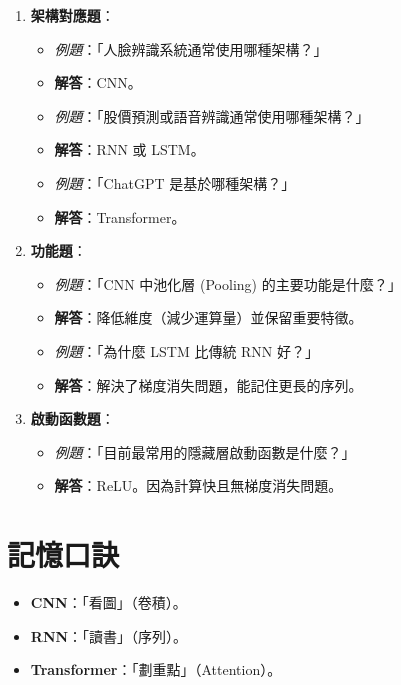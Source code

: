 \documentclass[
  letterpaper,
  DIV=11,
  numbers=noendperiod]{scrreprt}
\providecommand{\tightlist}{%
  \setlength{\itemsep}{0pt}\setlength{\parskip}{0pt}}
\begin{document}
\begin{enumerate}
\def\labelenumi{\arabic{enumi}.}
\tightlist
\item
  \textbf{架構對應題}：

  \begin{itemize}
  \tightlist
  \item
    \emph{例題}：「人臉辨識系統通常使用哪種架構？」
  \item
    \textbf{解答}：CNN。
  \item
    \emph{例題}：「股價預測或語音辨識通常使用哪種架構？」
  \item
    \textbf{解答}：RNN 或 LSTM。
  \item
    \emph{例題}：「ChatGPT 是基於哪種架構？」
  \item
    \textbf{解答}：Transformer。
  \end{itemize}
\item
  \textbf{功能題}：

  \begin{itemize}
  \tightlist
  \item
    \emph{例題}：「CNN 中池化層 (Pooling) 的主要功能是什麼？」
  \item
    \textbf{解答}：降低維度（減少運算量）並保留重要特徵。
  \item
    \emph{例題}：「為什麼 LSTM 比傳統 RNN 好？」
  \item
    \textbf{解答}：解決了梯度消失問題，能記住更長的序列。
  \end{itemize}
\item
  \textbf{啟動函數題}：

  \begin{itemize}
  \tightlist
  \item
    \emph{例題}：「目前最常用的隱藏層啟動函數是什麼？」
  \item
    \textbf{解答}：ReLU。因為計算快且無梯度消失問題。
  \end{itemize}
\end{enumerate}

\section{記憶口訣}\label{ux8a18ux61b6ux53e3ux8a23-6}

\begin{itemize}
\tightlist
\item
  \textbf{CNN}：「看圖」（卷積）。
\item
  \textbf{RNN}：「讀書」（序列）。
\item
  \textbf{Transformer}：「劃重點」（Attention）。
\end{itemize}
\end{document}
